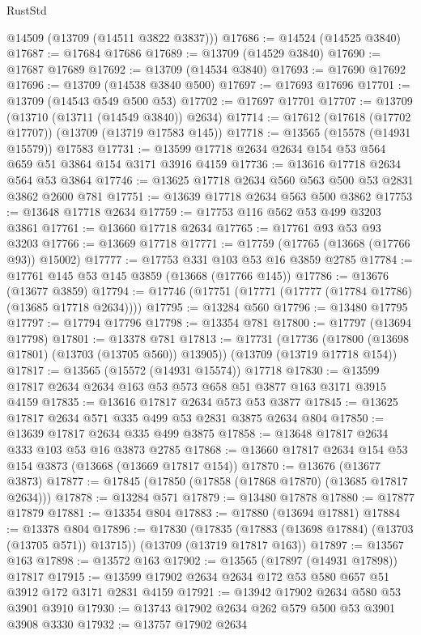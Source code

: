\begin{lexlean}{RustStd}
\begin{coremodule}
      @14509
      (@13709 (@14511 @3822 @3837)))
@17686 := @14524 (@14525 @3840)
@17687 := @17684 @17686
@17689 := @13709 (@14529 @3840)
@17690 := @17687 @17689
@17692 := @13709 (@14534 @3840)
@17693 := @17690 @17692
@17696 := @13709 (@14538 @3840 @500)
@17697 := @17693 @17696
@17701 := @13709 (@14543 @549 @500 @53)
@17702 := @17697 @17701
@17707 := @13709 (@13710 (@13711 (@14549 @3840)) @2634)
@17714 := @17612 (@17618 (@17702 @17707)) (@13709 (@13719 @17583 @145))
@17718 := @13565 (@15578 (@14931 @15579)) @17583
@17731 := @13599 @17718 @2634 @2634 @154 @53 @564 @659 @51 @3864 @154 @3171 @3916 @4159
@17736 := @13616 @17718 @2634 @564 @53 @3864
@17746 := @13625 @17718 @2634 @560 @563 @500 @53 @2831 @3862 @2600 @781
@17751 := @13639 @17718 @2634 @563 @500 @3862
@17753 := @13648 @17718 @2634
@17759 := @17753 @116 @562 @53 @499 @3203 @3861
@17761 := @13660 @17718 @2634
@17765 := @17761 @93 @53 @93 @3203
@17766 := @13669 @17718
@17771 := @17759 (@17765 (@13668 (@17766 @93)) @15002)
@17777 := @17753 @331 @103 @53 @16 @3859 @2785
@17784 := @17761 @145 @53 @145 @3859 (@13668 (@17766 @145))
@17786 := @13676 (@13677 @3859)
@17794 := @17746 (@17751 (@17771 (@17777 (@17784 @17786) (@13685 @17718 @2634))))
@17795 := @13284 @560
@17796 := @13480 @17795
@17797 := @17794 @17796
@17798 := @13354 @781
@17800 := @17797 (@13694 @17798)
@17801 := @13378 @781
@17813 := @17731
    (@17736 (@17800 (@13698 @17801) (@13703 (@13705 @560)) @13905))
    (@13709 (@13719 @17718 @154))
@17817 := @13565 (@15572 (@14931 @15574)) @17718
@17830 := @13599 @17817 @2634 @2634 @163 @53 @573 @658 @51 @3877 @163 @3171 @3915 @4159
@17835 := @13616 @17817 @2634 @573 @53 @3877
@17845 := @13625 @17817 @2634 @571 @335 @499 @53 @2831 @3875 @2634 @804
@17850 := @13639 @17817 @2634 @335 @499 @3875
@17858 := @13648 @17817 @2634 @333 @103 @53 @16 @3873 @2785
@17868 := @13660 @17817 @2634 @154 @53 @154 @3873 (@13668 (@13669 @17817 @154))
@17870 := @13676 (@13677 @3873)
@17877 := @17845 (@17850 (@17858 (@17868 @17870) (@13685 @17817 @2634)))
@17878 := @13284 @571
@17879 := @13480 @17878
@17880 := @17877 @17879
@17881 := @13354 @804
@17883 := @17880 (@13694 @17881)
@17884 := @13378 @804
@17896 := @17830
    (@17835 (@17883 (@13698 @17884) (@13703 (@13705 @571)) @13715))
    (@13709 (@13719 @17817 @163))
@17897 := @13567 @163
@17898 := @13572 @163
@17902 := @13565 (@17897 (@14931 @17898)) @17817
@17915 := @13599 @17902 @2634 @2634 @172 @53 @580 @657 @51 @3912 @172 @3171 @2831 @4159
@17921 := @13942 @17902 @2634 @580 @53 @3901 @3910
@17930 := @13743 @17902 @2634 @262 @579 @500 @53 @3901 @3908 @3330
@17932 := @13757 @17902 @2634

\end{coremodule}
\end{lexlean}
